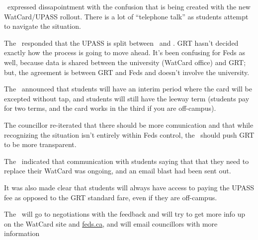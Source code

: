 \begin{information}
    \stephanie\ expressed dissapointment with the confusion that is being created
    with the new WatCard/UPASS rollout. There is a lot of ``telephone talk'' as
    students attempt to navigate the situation. 

    The \vped\ responded that the UPASS is split between \vped\ and \vpof. 
    GRT hasn't decided exactly how the process is going to move ahead. It's 
    been confusing for Feds as well, because data is shared between the 
    university (WatCard office) and GRT; but, the agreement is between GRT and 
    Feds and doesn't involve the university. 

    The \vped\ announced that students will have an interim period where the
    card will be excepted without tap, and students will still have the leeway
    term (students pay for two terms, and the card works in the third if you
    are off-campus).

    The councillor re-iterated that there should be more comunication and that
    while recognizing the situation isn't entirely within Feds control, the 
    \vped\ should push GRT to be more transparent.

    The \pres\ indicated that communication with students saying that that they
    need to replace their WatCard was ongoing, and an email blast had been
    sent out. 

    It was also made clear that students will always have access to paying the
    UPASS fee as opposed to the GRT standard fare, even if they are off-campus.

    The \vped\ will go to negotiations with the feedback and will try to get
    more info up on the WatCard site and \url{feds.ca}, and will email 
    councillors with more information
\end{information}
